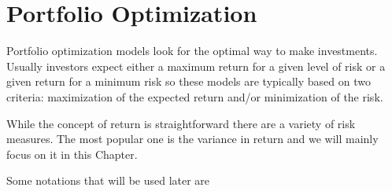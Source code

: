 \chapter{Portfolio Optimization}
\label{portfolio-optimization}

Portfolio optimization models look for the optimal way to make investments. Usually investors expect either a maximum return for a given level of risk or a given return for a minimum risk so these models are typically based on two criteria: maximization of the expected return and/or minimization of the risk.

While the concept of return is straightforward there are a variety of risk measures. The most popular one is the variance in return and we will mainly focus on it in this Chapter.

Some notations that will be used later are


